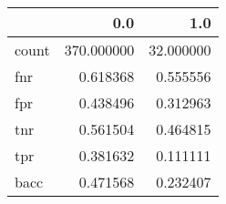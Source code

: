 \begin{tabular}{lrr}
\toprule
{} &         0.0 &        1.0 \\
\midrule
count &  370.000000 &  32.000000 \\
fnr   &    0.618368 &   0.555556 \\
fpr   &    0.438496 &   0.312963 \\
tnr   &    0.561504 &   0.464815 \\
tpr   &    0.381632 &   0.111111 \\
bacc  &    0.471568 &   0.232407 \\
\bottomrule
\end{tabular}

